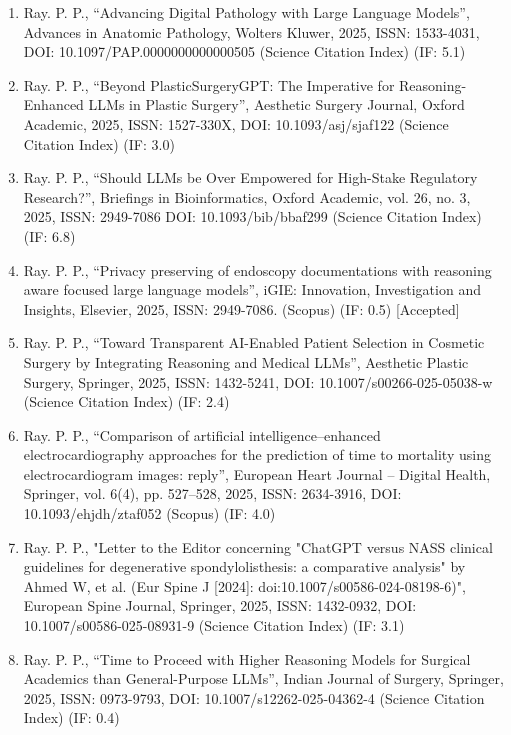 \documentclass[11pt,a4paper]{moderncv}
\begin{document}
\begin{adjustwidth}{6em}{0pt}
\begin{enumerate}
		\item Ray. P. P., “Advancing Digital Pathology with Large Language Models”, Advances in Anatomic Pathology, Wolters Kluwer, 2025, ISSN: 1533-4031, DOI: 10.1097/PAP.0000000000000505 (Science Citation Index) (IF: 5.1)
		
		\item Ray. P. P., “Beyond PlasticSurgeryGPT: The Imperative for Reasoning-Enhanced LLMs in Plastic Surgery”, Aesthetic Surgery Journal, Oxford Academic, 2025, ISSN: 1527-330X, DOI: 10.1093/asj/sjaf122 (Science Citation Index) (IF: 3.0)
		
		\item Ray. P. P., “Should LLMs be Over Empowered for High-Stake Regulatory Research?”, Briefings in Bioinformatics, Oxford Academic, vol. 26, no. 3, 2025, ISSN: 2949-7086 DOI: 10.1093/bib/bbaf299 (Science Citation Index) (IF: 6.8)
		
		\item Ray. P. P., “Privacy preserving of endoscopy documentations with reasoning aware focused large language models”, iGIE: Innovation, Investigation and Insights, Elsevier, 2025, ISSN: 2949-7086. (Scopus) (IF: 0.5) [Accepted]
		
		\item Ray. P. P., “Toward Transparent AI-Enabled Patient Selection in Cosmetic Surgery by Integrating Reasoning and Medical LLMs”, Aesthetic Plastic Surgery, Springer, 2025, ISSN: 1432-5241, DOI: 10.1007/s00266-025-05038-w (Science Citation Index) (IF: 2.4) 
		
		\item Ray. P. P., “Comparison of artificial intelligence–enhanced electrocardiography approaches for the prediction of time to mortality using electrocardiogram images: reply”, European Heart Journal – Digital Health, Springer, vol. 6(4), pp. 527–528, 2025, ISSN: 2634-3916, DOI: 10.1093/ehjdh/ztaf052 (Scopus) (IF: 4.0)
		
		\item Ray. P. P.,  "Letter to the Editor concerning "ChatGPT versus NASS clinical guidelines for degenerative spondylolisthesis: a comparative analysis" by Ahmed W, et al. (Eur Spine J [2024]: doi:10.1007/s00586-024-08198-6)", European Spine Journal, Springer, 2025, ISSN: 1432-0932, DOI: 10.1007/s00586-025-08931-9 (Science Citation Index) (IF: 3.1)
		\item Ray. P. P., “Time to Proceed with Higher Reasoning Models for Surgical Academics than General-Purpose LLMs”, Indian Journal of Surgery, Springer, 2025, ISSN: 0973-9793, DOI: 10.1007/s12262-025-04362-4 (Science Citation Index) (IF: 0.4)
		

\end{enumerate}
\end{adjustwidth}
\end{document}
